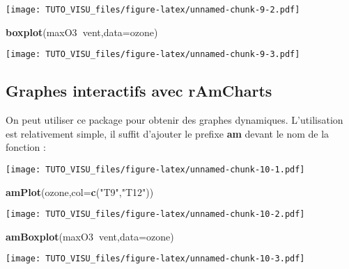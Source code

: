 \documentclass[]{book}
\newenvironment{Shaded}{\begin{snugshade}}{\end{snugshade}}
\newcommand{\DataTypeTok}[1]{\textcolor[rgb]{0.13,0.29,0.53}{#1}}
\newcommand{\KeywordTok}[1]{\textcolor[rgb]{0.13,0.29,0.53}{\textbf{#1}}}
\newcommand{\NormalTok}[1]{#1}
\newcommand{\OperatorTok}[1]{\textcolor[rgb]{0.81,0.36,0.00}{\textbf{#1}}}
\newcommand{\StringTok}[1]{\textcolor[rgb]{0.31,0.60,0.02}{#1}}
\theoremstyle{definition}
\theoremstyle{definition}
\theoremstyle{definition}
\theoremstyle{remark}
\begin{document}
\texttt{[image: TUTO\_VISU\_files/figure-latex/unnamed-chunk-9-2.pdf]}

\begin{Shaded}
\begin{Highlighting}[]
\KeywordTok{boxplot}\NormalTok{(maxO3}\OperatorTok{~}\NormalTok{vent,}\DataTypeTok{data=}\NormalTok{ozone)}
\end{Highlighting}
\end{Shaded}

\texttt{[image: TUTO\_VISU\_files/figure-latex/unnamed-chunk-9-3.pdf]}

\hypertarget{graphes-interactifs-avec-ramcharts}{%
\subsection{Graphes interactifs avec rAmCharts}\label{graphes-interactifs-avec-ramcharts}}

On peut utiliser ce package pour obtenir des graphes dynamiques. L'utilisation est relativement simple, il suffit d'ajouter le prefixe \textbf{am} devant le nom de la fonction :

\begin{Shaded}
\end{Shaded}

\texttt{[image: TUTO\_VISU\_files/figure-latex/unnamed-chunk-10-1.pdf]}

\begin{Shaded}
\begin{Highlighting}[]
\KeywordTok{amPlot}\NormalTok{(ozone,}\DataTypeTok{col=}\KeywordTok{c}\NormalTok{(}\StringTok{"T9"}\NormalTok{,}\StringTok{"T12"}\NormalTok{))}
\end{Highlighting}
\end{Shaded}

\texttt{[image: TUTO\_VISU\_files/figure-latex/unnamed-chunk-10-2.pdf]}

\begin{Shaded}
\begin{Highlighting}[]
\KeywordTok{amBoxplot}\NormalTok{(maxO3}\OperatorTok{~}\NormalTok{vent,}\DataTypeTok{data=}\NormalTok{ozone)}
\end{Highlighting}
\end{Shaded}

\texttt{[image: TUTO\_VISU\_files/figure-latex/unnamed-chunk-10-3.pdf]}
\end{document}
